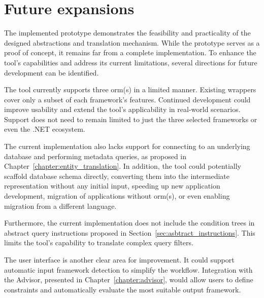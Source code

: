 \section{Future expansions}
The implemented prototype demonstrates the feasibility and practicality of the designed abstractions and translation mechanism. While the prototype serves as a proof of concept, it remains far from a complete implementation. To enhance the tool's capabilities and address its current limitations, several directions for future development can be identified. 

The tool currently supports three \acrshort{orm}(s) in a limited manner. Existing wrappers cover only a subset of each framework's features. Continued development could improve usability and extend the tool's applicability in real-world scenarios. Support does not need to remain limited to just the three selected frameworks or even the .NET ecosystem. 

The current implementation also lacks support for connecting to an underlying database and performing metadata queries, as proposed in Chapter~\ref{chapter:entity_translation}. In addition, the tool could potentially scaffold database schema directly, converting them into the intermediate representation without any initial input, speeding up new application development, migration of applications without \acrshort{orm}(s), or even enabling migration from a different language.

Furthermore, the current implementation does not include the condition trees in abstract query instructions proposed in Section~\ref{sec:asbtract_instructions}. This limits the tool's capability to translate complex query filters.
 
The user interface is another clear area for improvement. It could support automatic input framework detection to simplify the workflow. Integration with the Advisor, presented in Chapter~\ref{chapter:advisor}, would allow users to define constraints and automatically evaluate the most suitable output framework.
